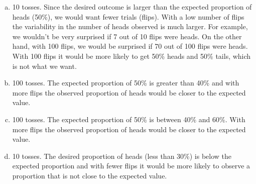 {
\begin{enumerate}[(a)]
\item 10 tosses. Since the desired outcome is larger than the expected proportion of heads (50\%), we would want fewer trials (flips). With a low number of flips the variability in the number of heads observed is much larger. For example, we wouldn't be very surprised if 7 out of 10 flips were heads. On the other hand, with 100 flips, we would be surprised if 70 out of 100 flips were heads. With 100 flips it would be more likely to get 50\% heads and 50\% tails, which is not what we want.
\item 100 tosses. The expected proportion of 50\% is greater than 40\% and with more flips the observed proportion of heads would be closer to the expected value.
\item 100 tosses. The expected proportion of 50\% is between 40\% and 60\%. With more flips the observed proportion of heads would be closer to the expected value.
\item 10 tosses. The desired proportion of heads (less than 30\%) is below the expected proportion and with fewer flips it would be more likely to observe a proportion that is not close to the expected value.
\end{enumerate}
}


